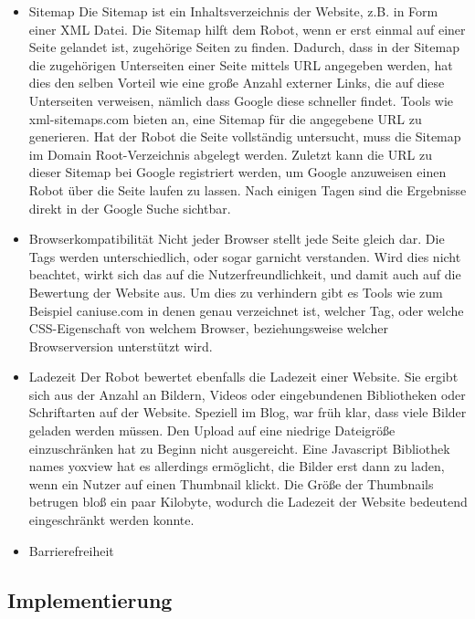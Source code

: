 \begin{itemize}
      \item Sitemap
      	Die Sitemap ist ein Inhaltsverzeichnis der Website, z.B. in Form einer XML Datei. Die Sitemap hilft dem Robot, wenn er erst einmal auf einer Seite gelandet ist, zugehörige Seiten
        zu finden. Dadurch, dass in der Sitemap die zugehörigen Unterseiten einer Seite mittels URL angegeben werden, hat dies den selben Vorteil wie eine große Anzahl externer Links, die auf diese
        Unterseiten verweisen, nämlich dass Google diese schneller findet. Tools wie xml-sitemaps.com bieten an, eine Sitemap für die angegebene URL zu generieren. Hat der Robot die Seite vollständig
        untersucht, muss die Sitemap im Domain Root-Verzeichnis abgelegt werden. Zuletzt kann die URL zu dieser Sitemap bei Google registriert werden, um Google anzuweisen einen Robot über die Seite
        laufen zu lassen. Nach einigen Tagen sind die Ergebnisse direkt in der Google Suche sichtbar.

      \item Browserkompatibilität
        Nicht jeder Browser stellt jede Seite gleich dar. Die Tags werden unterschiedlich, oder sogar garnicht verstanden. Wird dies nicht beachtet, wirkt sich das auf die Nutzerfreundlichkeit,
        und damit auch auf die Bewertung der Website aus. Um dies zu verhindern gibt es Tools wie zum Beispiel caniuse.com in denen genau verzeichnet ist, welcher Tag, oder welche CSS-Eigenschaft
        von welchem Browser, beziehungsweise welcher Browserversion unterstützt wird.

      \item Ladezeit
        Der Robot bewertet ebenfalls die Ladezeit einer Website. Sie ergibt sich aus der Anzahl an Bildern, Videos oder eingebundenen Bibliotheken oder Schriftarten auf der Website.
        Speziell im Blog, war früh klar, dass viele Bilder geladen werden müssen. Den Upload auf eine niedrige Dateigröße einzuschränken hat zu Beginn nicht ausgereicht.
        Eine Javascript Bibliothek names yoxview hat es allerdings ermöglicht, die Bilder erst dann zu laden, wenn ein Nutzer auf einen Thumbnail klickt. Die Größe der Thumbnails betrugen bloß
        ein paar Kilobyte, wodurch die Ladezeit der Website bedeutend eingeschränkt werden konnte.

      \item Barrierefreiheit

    \end{itemize}
  \subsection{Implementierung}

